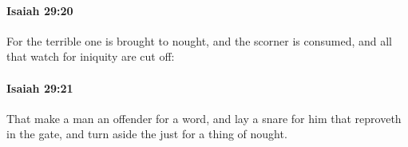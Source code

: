 		\paragraph{Isaiah 29:20} %
			\label{ISAIAH-29-20}

			For the terrible one is brought to nought, and the scorner is consumed, and all that watch for iniquity are cut off:


		\paragraph{Isaiah 29:21} %
			\label{ISAIAH-29-21}

			That make a man an offender for a word, and lay a snare for him that reproveth in the gate, and turn aside the just for a thing of nought.


